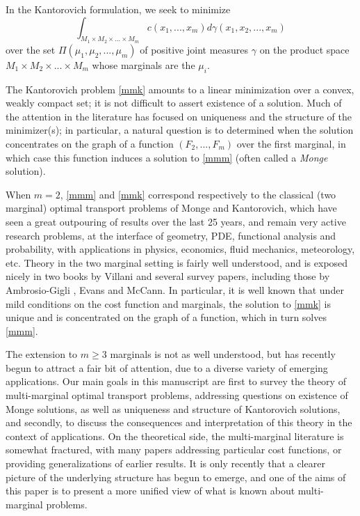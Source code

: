 \documentclass[letter,10pt]{article}
\theoremstyle{dotless}
\begin{document}
In the Kantorovich formulation, we seek to minimize 
\begin{equation}\label{mmk}
\int_{M_1 \times M_2 \times ... \times M_m}c(x_1,...,x_m)d\gamma(x_1,x_2,...,x_m)
\end{equation}
over the set $\Pi(\mu_1,\mu_2,...,\mu_m)$ of positive joint measures $\gamma$ on the product space $M_1 \times M_2 \times ... \times M_m$ whose marginals are the $\mu_i$.  

The Kantorovich problem \eqref{mmk} amounts to a linear minimization over a convex, weakly compact set; it is not difficult to assert existence of a solution.  Much of the attention in the literature has focused on uniqueness and the structure of the minimizer(s); in particular, a natural question is to determined when the solution concentrates on the graph of a function $(F_2,...,F_m)$ over the first marginal, in which case this function induces a solution to \eqref{mmm} (often called a \textit{Monge} solution).

When $m=2$, \eqref{mmm} and \eqref{mmk} correspond respectively to the classical (two marginal) optimal transport problems of Monge and Kantorovich, which have seen a great outpouring of results over the last 25 years, and remain very active research problems, at the interface of geometry, PDE, functional analysis and probability, with applications in physics, economics, fluid mechanics, meteorology, etc.  Theory in the two marginal setting is fairly well understood, and is exposed nicely in two books by Villani \cite{V,V2} and several survey papers, including those by Ambrosio-Gigli \cite{AG13}, Evans \cite{Evans} and McCann\cite{Mc14}.  In particular, it is well known that under mild conditions on the cost function and marginals, the solution to \eqref{mmk} is unique and is concentrated on the graph of a function, which in turn solves \eqref{mmm}.

The extension to $m \geq 3$ marginals is not as well understood, but has recently begun to attract a fair bit of attention, due to a diverse variety of emerging applications.  Our main goals in this manuscript are first to survey the theory of multi-marginal optimal transport problems, addressing questions on existence of Monge solutions, as well as uniqueness and structure of Kantorovich solutions, and secondly, to discuss the consequences and interpretation of this theory in the context of applications.  On the theoretical side, the multi-marginal literature is somewhat fractured, with many papers addressing particular cost functions, or providing generalizations of earlier results.  It is only recently that a clearer picture of the underlying structure has begun to emerge, and one of the aims of this paper is to present a more unified view of what is known about multi-marginal problems. 
\end{document}
